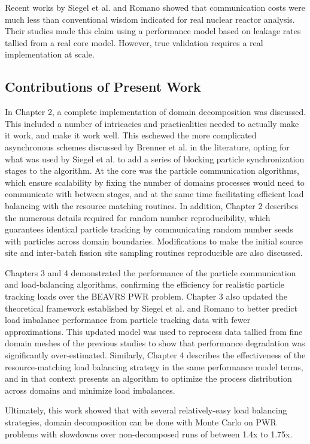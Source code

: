 Recent works by Siegel et al. and Romano showed that communication costs were
much less than conventional wisdom indicated for real nuclear reactor analysis.
Their studies made this claim using a performance model based on leakage rates
tallied from a real core model. However, true validation requires a real
implementation at scale.

\subsection{Contributions of Present Work}

In Chapter 2, a complete implementation of domain decomposition was discussed.
This included a number of intricacies and practicalities needed to actually make
it work, and make it work well. This eschewed the more complicated asynchronous
schemes discussed by Brenner et al. in the literature, opting for what was used
by Siegel et al. to add a series of blocking particle synchronization stages to
the algorithm. At the core was the particle communication algorithms, which
ensure scalability by fixing the number of domains processes would need to
communicate with between stages, and at the same time facilitating efficient
load balancing with the resource matching routines. In addition, Chapter 2
describes the numerous details required for random number reproducibility,
which guarantees identical particle tracking by communicating random number seeds
with particles across domain boundaries. Modifications to make the initial
source site and inter-batch fission site sampling routines reproducible are also
discussed.

Chapters 3 and 4 demonstrated the performance of the particle communication and
load-balancing algorithms, confirming the efficiency for realistic particle
tracking loads over the BEAVRS \ac{PWR} problem. Chapter 3 also
updated the theoretical framework established by Siegel et al. and Romano to
better predict load imbalance performance from particle tracking data with fewer
approximations. This updated model was used to reprocess data tallied from fine
domain meshes of the previous studies to show that performance degradation was
significantly over-estimated. Similarly, Chapter 4 describes the effectiveness
of the resource-matching load balancing strategy in the same performance model
terms, and in that context presents an algorithm to optimize the process
distribution across domains and minimize load imbalances.

Ultimately, this work showed that with several relatively-easy load balancing
strategies, domain decomposition can be done with Monte Carlo on \ac{PWR}
problems with slowdowns over non-decomposed runs of between 1.4x to 1.75x.

